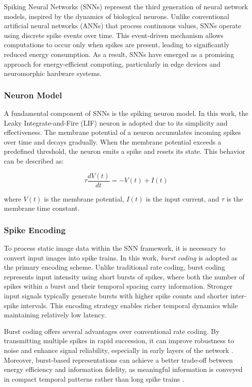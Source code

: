 \documentclass[../main.tex]{subfiles}
\begin{document}
Spiking Neural Networks (SNNs) represent the third generation of neural network models, inspired by the dynamics of biological neurons. Unlike conventional artificial neural networks (ANNs) that process continuous values, SNNs operate using discrete spike events over time. This event-driven mechanism allows computations to occur only when spikes are present, leading to significantly reduced energy consumption. As a result, SNNs have emerged as a promising approach for energy-efficient computing, particularly in edge devices and neuromorphic hardware systems.

\subsubsection{Neuron Model}

A fundamental component of SNNs is the spiking neuron model. In this work, the Leaky Integrate-and-Fire (LIF) neuron is adopted due to its simplicity and effectiveness. The membrane potential of a neuron accumulates incoming spikes over time and decays gradually. When the membrane potential exceeds a predefined threshold, the neuron emits a spike and resets its state. This behavior can be described as:

\begin{equation}
\tau \frac{dV(t)}{dt} = -V(t) + I(t)
\end{equation}

where $V(t)$ is the membrane potential, $I(t)$ is the input current, and $\tau$ is the membrane time constant.

\subsubsection{Spike Encoding}

To process static image data within the SNN framework, it is necessary to convert input images into spike trains. In this work, \textit{burst coding} is adopted as the primary encoding scheme. Unlike traditional rate coding, burst coding represents input intensity using short bursts of spikes, where both the number of spikes within a burst and their temporal spacing carry information. Stronger input signals typically generate bursts with higher spike counts and shorter inter-spike intervals. This encoding strategy enables richer temporal dynamics while maintaining relatively low latency.

Burst coding offers several advantages over conventional rate coding. By transmitting multiple spikes in rapid succession, it can improve robustness to noise and enhance signal reliability, especially in early layers of the network \cite{panda2016unsupervisedregenerativelearninghierarchical}. Moreover, burst-based representations can achieve a better trade-off between energy efficiency and information fidelity, as meaningful information is conveyed in compact temporal patterns rather than long spike trains \cite{park2019fastefficientinformationtransmission}.
\end{document}
